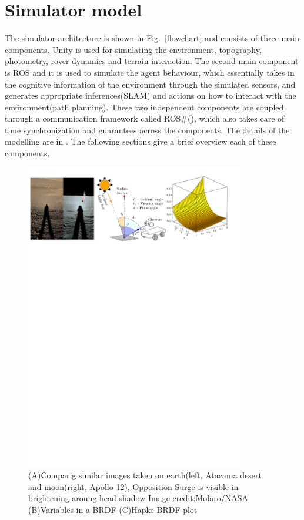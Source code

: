 \documentclass[a4paper, 10pt, conference]{ieeeconf}      %
\begin{document}
\section{Simulator model}
The simulator architecture is shown in Fig.~\ref{flowchart} and consists of three main components. Unity is used for simulating the environment, topography, photometry, rover dynamics and terrain interaction. The second main component is ROS and it is used to simulate the agent behaviour, which essentially takes in the cognitive information of the environment through the simulated sensors, and generates appropriate inferences(SLAM) and actions on how to interact with the environment(path planning). These two independent components are coupled through a communication framework called ROS\#(\cite{bischoffm_2019_06}), which also takes care of time synchronization and guarantees across the components. The details of the modelling are in \cite{msm2020rss}. The following sections give a brief overview each of these components.
\begin{figure}[t]
      \centering
        \includegraphics[width=0.85\textwidth]{Figures/brdf_mod_iros.pdf}
      \caption{(A)Comparig similar images taken on earth(left, Atacama desert and moon(right, Apollo 12), Opposition Surge is visible in brightening aroung head shadow Image credit:Molaro/NASA (B)Variables in a BRDF (C)Hapke BRDF plot}
      \vspace{-1em}
      \label{osbrdf}
\end{figure}
\end{document}
